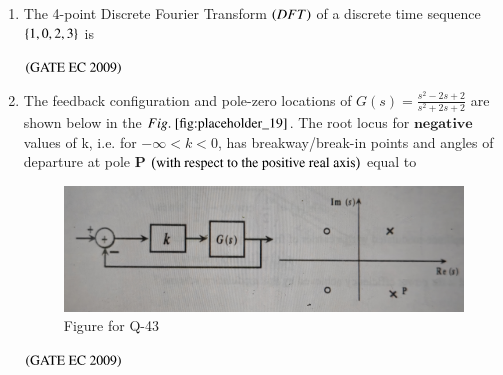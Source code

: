 \documentclass[journal,12pt,onecolumn]{IEEEtran}
\theoremstyle{remark}
\begin{document}
\begin{enumerate}[start=1, label={Q\arabic*.}]
\item The 4-point Discrete Fourier Transform $\left(DFT\right)$ of a discrete time sequence $\left\{1,0,2,3\right\}$ is 
\begin{enumerate}
\end{enumerate}
\hfill $\left(\text{GATE EC 2009}\right)$

\item The feedback configuration and pole-zero locations of $G(s) = \frac{s^2 -2s +2}{s^2 +2s +2}$ are shown below in the $\figref{fig:placeholder_19}$. The root locus for $\textbf{negative}$ values of k, i.e. for $-\infty < k<0$, has breakway/break-in points and angles of departure at pole $\textbf{P}$ $\left(\text{with respect to the positive real axis}\right)$ equal to 
\begin{figure}[H]
    \centering
    \includegraphics[width=0.5\columnwidth]{figs/fig_19.jpg}
    \caption{\centering Figure for Q-43}
    \label{fig:placeholder_19}
\end{figure}
\begin{enumerate}
\end{enumerate}
\hfill $\left(\text{GATE EC 2009}\right)$



\end{enumerate}
\end{document}
